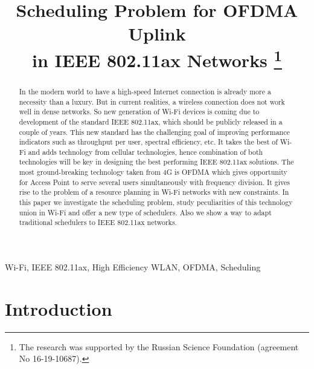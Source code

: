 
%


\IEEEoverridecommandlockouts

\title{%
Scheduling Problem for OFDMA Uplink \\in IEEE 802.11ax Networks
\thanks{The research was supported by the Russian Science Foundation (agreement No 16-19-10687).}}

\author{
}

\maketitle

\begin{abstract}
In the modern world to have a high-speed Internet connection is already more a necessity than a luxury. 
But in current realities, a wireless connection does not work well in dense networks. 
So new generation of Wi-Fi devices is coming due to development of the standard IEEE 802.11ax, which should be publicly released in a couple of years. 
This new standard has the challenging goal of improving performance indicators such as throughput per user, spectral efficiency, etc. 
It takes the best of Wi-Fi and adds technology from cellular technologies, hence combination of both technologies will be key in designing the best performing IEEE 802.11ax solutions. The most ground-breaking technology taken from 4G is OFDMA which gives opportunity for Access Point to serve several users simultaneously with frequency division. 
It gives rise to the problem of a resource planning in Wi-Fi networks with new constraints.
In this paper we investigate the scheduling problem, study peculiarities of this technology union in Wi-Fi and offer a new type of schedulers.
Also we show a way to adapt traditional schedulers to  IEEE 802.11ax networks.
\end{abstract}

\begin{IEEEkeywords}
Wi-Fi, IEEE 802.11ax, High Efficiency WLAN, OFDMA, Scheduling
\end{IEEEkeywords}

\section{Introduction}

